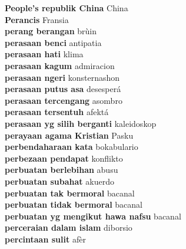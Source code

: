 \textbf{ People’s republik China  } China \\
\textbf{ Perancis  } Fransia \\
\textbf{ perang berangan  } brùin \\
\textbf{ perasaan benci  } antipatia \\
\textbf{ perasaan hati  } klima \\
\textbf{ perasaan kagum  } admiracion \\
\textbf{ perasaan ngeri  } konsternashon \\
\textbf{ perasaan putus asa  } desesperá \\
\textbf{ perasaan tercengang  } asombro \\
\textbf{ perasaan tersentuh  } afektá \\
\textbf{ perasaan yg silih berganti  } kaleidoskop \\
\textbf{ perayaan agama Kristian  } Pasku \\
\textbf{ perbendaharaan kata  } bokabulario \\
\textbf{ perbezaan pendapat  } konflikto \\
\textbf{ perbuatan berlebihan  } abusu \\
\textbf{ perbuatan subahat  } akuerdo \\
\textbf{ perbuatan tak bermoral  } bacanal \\
\textbf{ perbuatan tidak bermoral  } bacanal \\
\textbf{ perbuatan yg mengikut hawa nafsu  } bacanal \\
\textbf{ perceraian dalam islam  } diborsio \\
\textbf{ percintaan sulit  } afèr \\
